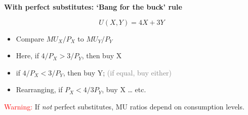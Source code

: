 \documentclass[table]{beamer}
\providecommand{\tightlist}{%
  \setlength{\itemsep}{0pt}\setlength{\parskip}{0pt}}
\begin{document}
\begin{frame}

\textbf{With perfect substitutes: `Bang for the buck' rule}

\[U(X,Y)=4X+3Y\]

\bigskip

\begin{itemize}
\tightlist
\item
  Compare \(MU_X/P_X\) to \(MU_Y/P_Y\)
\end{itemize}

\begin{itemize}
\item
  Here, if \(4/P_X > 3/P_Y\), then buy X
\item
  if \(4/P_X < 3/P_Y\), then buy Y;
  \textcolor{gray}{(if equal, buy either)}
\item
  Rearranging, if \(P_X < 4/3 P_Y\), buy X \ldots{} etc.
\end{itemize}

\textcolor{red}{Warning:} If \emph{not} perfect substitutes, MU ratios
depend on consumption levels.

\end{frame}
\end{document}
